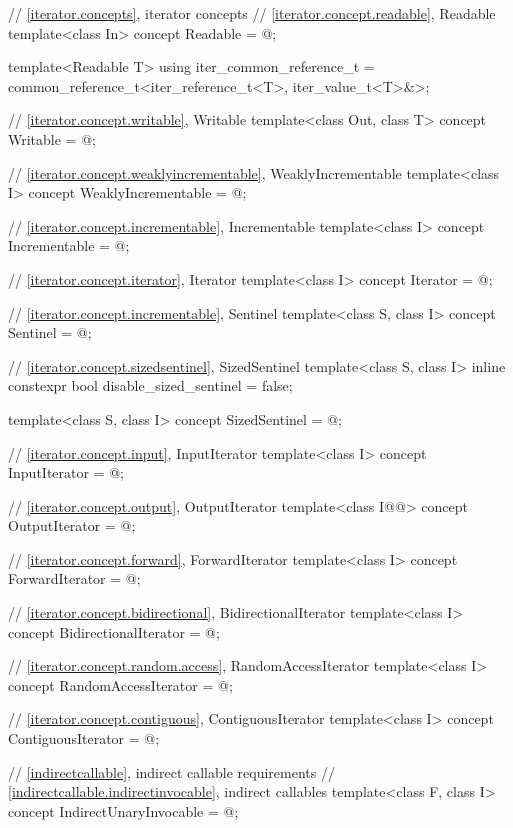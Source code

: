 \begin{addedblock}
\begin{codeblock}
  // \ref{iterator.concepts}, iterator concepts
  // \ref{iterator.concept.readable}, Readable
  template<class In>
    concept Readable = @\seebelownc@;

  template<Readable T>
    using iter_common_reference_t =
      common_reference_t<iter_reference_t<T>, iter_value_t<T>&>;

  // \ref{iterator.concept.writable}, Writable
  template<class Out, class T>
    concept Writable = @\seebelownc@;

  // \ref{iterator.concept.weaklyincrementable}, WeaklyIncrementable
  template<class I>
    concept WeaklyIncrementable = @\seebelownc@;

  // \ref{iterator.concept.incrementable}, Incrementable
  template<class I>
    concept Incrementable = @\seebelownc@;

  // \ref{iterator.concept.iterator}, Iterator
  template<class I>
    concept Iterator = @\seebelownc@;

  // \ref{iterator.concept.incrementable}, Sentinel
  template<class S, class I>
    concept Sentinel = @\seebelownc@;

  // \ref{iterator.concept.sizedsentinel}, SizedSentinel
  template<class S, class I>
    inline constexpr bool disable_sized_sentinel = false;

  template<class S, class I>
    concept SizedSentinel = @\seebelownc@;

  // \ref{iterator.concept.input}, InputIterator
  template<class I>
    concept InputIterator = @\seebelownc@;

  // \ref{iterator.concept.output}, OutputIterator
  template<class I@@>
    concept OutputIterator = @\seebelownc@;

  // \ref{iterator.concept.forward}, ForwardIterator
  template<class I>
    concept ForwardIterator = @\seebelownc@;

  // \ref{iterator.concept.bidirectional}, BidirectionalIterator
  template<class I>
    concept BidirectionalIterator = @\seebelownc@;

  // \ref{iterator.concept.random.access}, RandomAccessIterator
  template<class I>
    concept RandomAccessIterator = @\seebelownc@;

  // \ref{iterator.concept.contiguous}, ContiguousIterator
  template<class I>
    concept ContiguousIterator = @\seebelownc@;

  // \ref{indirectcallable}, indirect callable requirements
  // \ref{indirectcallable.indirectinvocable}, indirect callables
  template<class F, class I>
    concept IndirectUnaryInvocable = @\seebelownc@;


\end{codeblock}
\end{addedblock}
